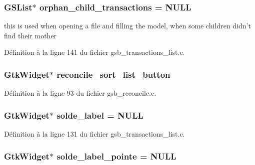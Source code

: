 \subsubsection[{orphan\_\-child\_\-transactions}]{\setlength{\rightskip}{0pt plus 5cm}GSList$\ast$ {\bf orphan\_\-child\_\-transactions} = NULL}\label{gsb__transactions__list_8c_ac2f7ca891d6c3a7cfb5c8df02918cf7c}
this is used when opening a file and filling the model, when some children didn't find their mother 

Définition à la ligne 141 du fichier gsb\_\-transactions\_\-list.c.

\subsubsection[{reconcile\_\-sort\_\-list\_\-button}]{\setlength{\rightskip}{0pt plus 5cm}GtkWidget$\ast$ {\bf reconcile\_\-sort\_\-list\_\-button}}\label{gsb__transactions__list_8c_a3cc34f74c4d6dae91c269439b2ea894c}


Définition à la ligne 93 du fichier gsb\_\-reconcile.c.

\subsubsection[{solde\_\-label}]{\setlength{\rightskip}{0pt plus 5cm}GtkWidget$\ast$ {\bf solde\_\-label} = NULL}\label{gsb__transactions__list_8c_a13463693429f5d9aeefc559d1a72ab84}


Définition à la ligne 131 du fichier gsb\_\-transactions\_\-list.c.

\subsubsection[{solde\_\-label\_\-pointe}]{\setlength{\rightskip}{0pt plus 5cm}GtkWidget$\ast$ {\bf solde\_\-label\_\-pointe} = NULL}\label{gsb__transactions__list_8c_a1a07890c391001f8dbed340113145fab}


